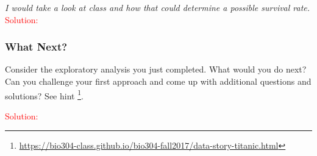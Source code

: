 \documentclass[
]{article}
\begin{document}
\emph{I would take a look at class and how that could determine a
possible survival rate.} \textcolor{red}{Solution: }\emph{}

\hypertarget{what-next}{%
\subsubsection{What Next?}\label{what-next}}

Consider the exploratory analysis you just completed. What would you do
next? Can you challenge your first approach and come up with additional
questions and solutions? See hint \footnote{\url{https://bio304-class.github.io/bio304-fall2017/data-story-titanic.html}}.

\textcolor{red}{Solution: }\emph{}
\end{document}
